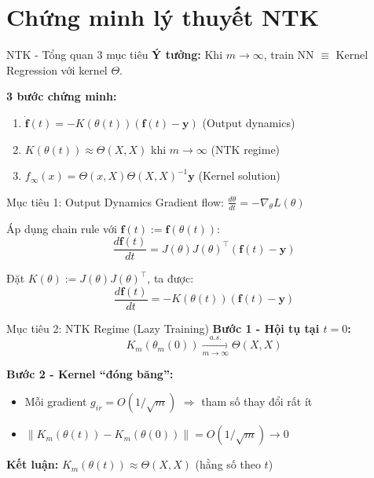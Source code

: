 \section{Chứng minh lý thuyết NTK}

\begin{frame}{NTK - Tổng quan 3 mục tiêu}
  \textbf{Ý tưởng:} Khi $m \to \infty$, train NN $\equiv$ Kernel Regression với kernel $\Theta$.

  \vspace{0.4cm}
  \textbf{3 bước chứng minh:}
  \begin{enumerate}
    \item $\dot{\mathbf{f}}(t) = -K(\theta(t))(\mathbf{f}(t)-\mathbf{y})$ \hfill {\scriptsize (Output dynamics)}
    \item $K(\theta(t)) \approx \Theta(X,X)$ khi $m \to \infty$ \hfill {\scriptsize (NTK regime)}
    \item $f_\infty(x) = \Theta(x,X)\Theta(X,X)^{-1}\mathbf{y}$ \hfill {\scriptsize (Kernel solution)}
  \end{enumerate}
\end{frame}

\begin{frame}{Mục tiêu 1: Output Dynamics}
  Gradient flow: $\frac{d\theta}{dt} = -\nabla_\theta L(\theta)$
  
  \vspace{0.3cm}
  Áp dụng chain rule với $\mathbf{f}(t) := \mathbf{f}(\theta(t))$:
  \[
    \frac{d\mathbf{f}(t)}{dt} = J(\theta)J(\theta)^\top (\mathbf{f}(t) - \mathbf{y})
  \]
  
  Đặt $K(\theta) := J(\theta)J(\theta)^\top$, ta được:
  \[
    \boxed{\frac{d\mathbf{f}(t)}{dt} = -K(\theta(t))(\mathbf{f}(t) - \mathbf{y})}
  \]
\end{frame}

\begin{frame}{Mục tiêu 2: NTK Regime (Lazy Training)}
  \textbf{Bước 1 - Hội tụ tại $t=0$:}
  \[
    K_m(\theta_m(0)) \xrightarrow[m\to\infty]{a.s.} \Theta(X,X)
  \]
  
  \textbf{Bước 2 - Kernel ``đóng băng'':}
  \begin{itemize}
    \item Mỗi gradient $g_{ir} = O(1/\sqrt{m})$ $\Rightarrow$ tham số thay đổi rất ít
    \item $\|K_m(\theta(t)) - K_m(\theta(0))\| = O(1/\sqrt{m}) \to 0$
  \end{itemize}
  
  \vspace{0.2cm}
  \textbf{Kết luận:} $K_m(\theta(t)) \approx \Theta(X,X)$ (hằng số theo $t$)
\end{frame}

